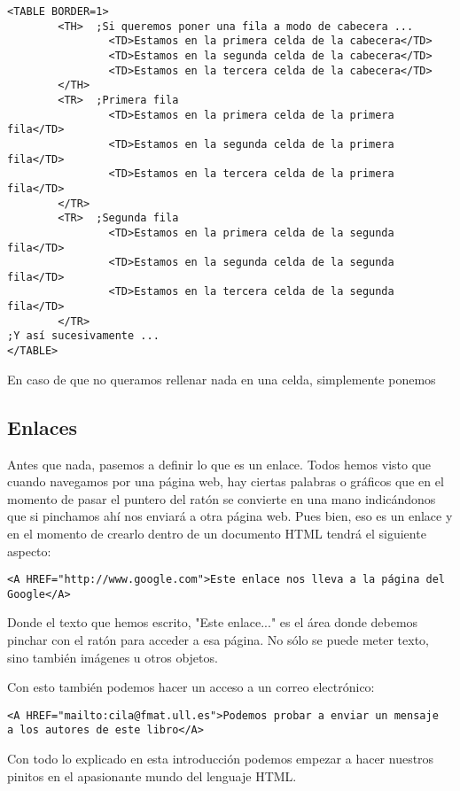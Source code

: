 
\begin{verbatim}
<TABLE BORDER=1>
        <TH>  ;Si queremos poner una fila a modo de cabecera ...
                <TD>Estamos en la primera celda de la cabecera</TD>
                <TD>Estamos en la segunda celda de la cabecera</TD>
                <TD>Estamos en la tercera celda de la cabecera</TD>
        </TH>
        <TR>  ;Primera fila
                <TD>Estamos en la primera celda de la primera fila</TD>
                <TD>Estamos en la segunda celda de la primera fila</TD>
                <TD>Estamos en la tercera celda de la primera fila</TD>
        </TR>
        <TR>  ;Segunda fila
                <TD>Estamos en la primera celda de la segunda fila</TD>
                <TD>Estamos en la segunda celda de la segunda fila</TD>
                <TD>Estamos en la tercera celda de la segunda fila</TD>
        </TR>
;Y así sucesivamente ...
</TABLE>
\end{verbatim}

En caso  de que no  queramos rellenar  nada en una  celda, simplemente
ponemos 

\subsection{Enlaces}

Antes que  nada, pasemos a  definir lo que  es un enlace.  Todos hemos
visto que cuando navegamos por una  página web, hay ciertas palabras o
gráficos que en el momento de  pasar el puntero del ratón se convierte
en  una mano  indicándonos que  si pinchamos  ahí nos  enviará a  otra
página web.  Pues bien, eso  es un enlace y  en el momento  de crearlo
dentro de un documento HTML tendrá el siguiente aspecto:

\begin{verbatim}
<A HREF="http://www.google.com">Este enlace nos lleva a la página del
Google</A>
\end{verbatim}

Donde el  texto que hemos escrito,  "Este enlace..." es el  área donde
debemos pinchar  con el ratón  para acceder a  esa página. No  sólo se
puede meter texto, sino también imágenes u otros objetos.

Con esto también podemos hacer un acceso a un correo electrónico:

\begin{verbatim}
<A HREF="mailto:cila@fmat.ull.es">Podemos probar a enviar un mensaje
a los autores de este libro</A>
\end{verbatim}

Con todo  lo explicado  en esta introducción  podemos empezar  a hacer
nuestros pinitos en el apasionante mundo del lenguaje HTML.
